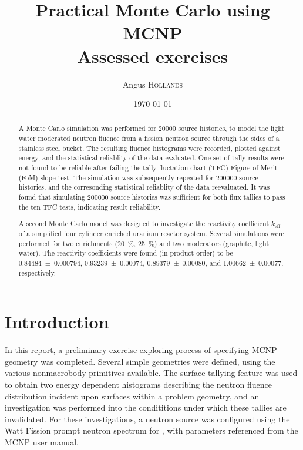 \documentclass{article}
\title{Practical Monte Carlo using MCNP \\ Assessed exercises} %
\author{Angus \textsc{Hollands}} %
\date{\today} %
\begin{document}
\maketitle %


\begin{abstract}
  A Monte Carlo simulation was performed for \num{20000} source histories, to model the light water moderated neutron fluence from a fission neutron source through the sides of a stainless steel bucket. The resulting fluence histograms were recorded, plotted against energy, and the statistical reliablity of the data evaluated. One set of tally results were not found to be reliable after failing the tally fluctation chart (TFC) Figure of Merit (FoM) slope test. The simulation was subsequently repeated for \num{200000} source histories, and the corresonding statistical reliablity of the data re\textendash evaluated. It was found that simulating \num{200000} source histories was sufficient for both flux tallies to pass the ten TFC tests, indicating result reliability.

  A second Monte Carlo model was designed to investigate the reactivity coefficient $k_{\text{eff}}$ of a simplified four cylinder enriched uranium reactor system. Several simulations were performed for two enrichments (\SI{20}{\percent}, \SI{25}{\percent}) and two moderators (graphite, light water). The reactivity coefficients were found (in product order) to be \num{0.84484\pm0.000794}, \num{0.93239 \pm 0.00074}, \num{0.89379\pm 0.00080}, and \num{1.00662 \pm 0.00077}, respectively.
\end{abstract}

\section{Introduction}
In this report, a preliminary exercise exploring process of specifying MCNP geometry was completed. Several simple geometries were defined, using the various non\textendash macrobody primitives available. The surface tallying feature was used to obtain two energy dependent histograms describing the neutron fluence distribution incident upon surfaces within a problem geometry, and an investigation was performed into the condititions under which these tallies are invalidated. For these investigations, a neutron source was configured using the Watt Fission prompt neutron spectrum for , with parameters referenced from the MCNP user manual.
\end{document}
